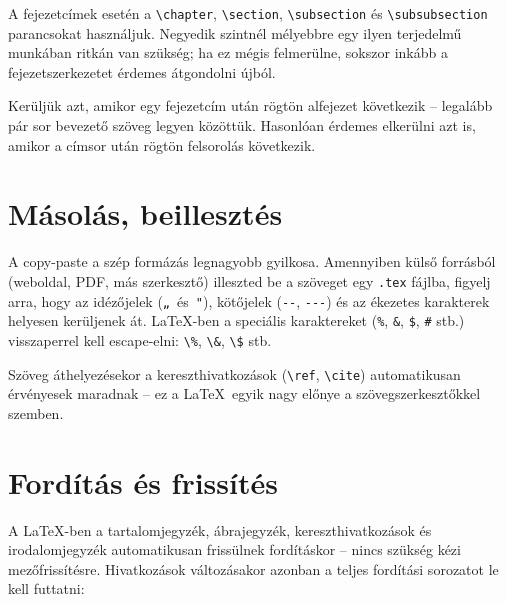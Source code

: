 A fejezetcímek esetén a \verb|\chapter|, \verb|\section|, \verb|\subsection|
és \verb|\subsubsection| parancsokat használjuk. Negyedik szintnél mélyebbre
egy ilyen terjedelmű munkában ritkán van szükség; ha ez mégis felmerülne,
sokszor inkább a fejezetszerkezetet érdemes átgondolni újból.

Kerüljük azt, amikor egy fejezetcím után rögtön alfejezet következik -- legalább
pár sor bevezető szöveg legyen közöttük. Hasonlóan érdemes elkerülni azt is,
amikor a címsor után rögtön felsorolás következik.

\section{Másolás, beillesztés}

A copy-paste a szép formázás legnagyobb gyilkosa. Amennyiben külső forrásból
(weboldal, PDF, más szerkesztő) illeszted be a szöveget egy \texttt{.tex}
fájlba, figyelj arra, hogy az idézőjelek (\verb|„|~és~\verb|"|), kötőjelek
(\verb|--|, \verb|---|) és az ékezetes karakterek helyesen kerüljenek át.
\LaTeX-ben a speciális karaktereket (\verb|%|, \verb|&|, \verb|$|, \verb|#|
stb.) visszaperrel kell escape-elni: \verb|\%|, \verb|\&|, \verb|\$| stb.

Szöveg áthelyezésekor a kereszthivatkozások (\verb|\ref|, \verb|\cite|)
automatikusan érvényesek maradnak -- ez a \LaTeX\ egyik nagy előnye a
szövegszerkesztőkkel szemben.

\section{Fordítás és frissítés}
\label{sec:forditas}

A \LaTeX-ben a tartalomjegyzék, ábrajegyzék, kereszthivatkozások és
irodalomjegyzék automatikusan frissülnek fordításkor -- nincs szükség kézi
mezőfrissítésre. Hivatkozások változásakor azonban a teljes fordítási
sorozatot le kell futtatni:

